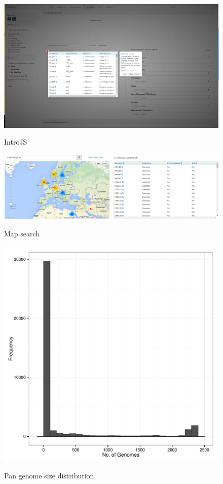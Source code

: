 \documentclass[doublespacing, linenumbers]{bmcart}
\begin{document}
\begin{backmatter}
\begin{figure}[h!]
  \caption{IntroJS}
  \includegraphics[width=0.9\columnwidth]{images/introjs_vfamr.png}
  \label{fig:intojs}
\end{figure}

\begin{figure}[h!]
  \caption{Map search}
  \includegraphics[width=0.9\columnwidth]{images/uk-map.png}
  \label{fig:map_search}
\end{figure}

\begin{figure}[h!]
  \caption{Pan genome size distribution}
  \includegraphics[width=0.9\columnwidth]{images/panGenomeSize.pdf}
  \label{fig:pan_genome_size}
\end{figure}



\end{backmatter}
\end{document}
